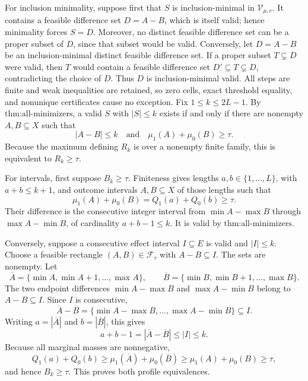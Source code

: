 For inclusion minimality, suppose first that \(S\) is inclusion-minimal in \(\mathcal V_{\mu,c}\).  It contains a feasible difference set \(D=A-B\), which is itself valid; hence minimality forces \(S=D\).  Moreover, no distinct feasible difference set can be a proper subset of \(D\), since that subset would be valid.  Conversely, let \(D=A-B\) be an inclusion-minimal distinct feasible difference set.  If a proper subset \(T\subsetneq D\) were valid, then \(T\) would contain a feasible difference set \(D'\subseteq T\subsetneq D\), contradicting the choice of \(D\).  Thus \(D\) is inclusion-minimal valid.  All steps are finite and weak inequalities are retained, so zero cells, exact threshold equality, and nonunique certificates cause no exception.
Fix \(1\leq k\leq2L-1\).  By \(\text{thm:all-minimizers}\), a valid \(S\) with \(|S|\leq k\) exists if and only if there are nonempty \(A,B\subseteq X\) such that
\[
|A-B|\leq k
\quad\text{and}\quad
\mu_1(A)+\mu_0(B)\geq\tau.
\]
Because the maximum defining \(R_k\) is over a nonempty finite family, this is equivalent to \(R_k\geq\tau\).

For intervals, first suppose \(B_k\geq\tau\).  Finiteness gives lengths \(a,b\in\{1,\ldots,L\}\), with \(a+b\leq k+1\), and outcome intervals \(A,B\subseteq X\) of those lengths such that
\[
\mu_1(A)+\mu_0(B)=Q_1(a)+Q_0(b)\geq\tau.
\]
Their difference is the consecutive integer interval from \(\min A-\max B\) through \(\max A-\min B\), of cardinality \(a+b-1\leq k\).  It is valid by \(\text{thm:all-minimizers}\).

Conversely, suppose a consecutive effect interval \(I\subseteq E\) is valid and \(|I|\leq k\).  Choose a feasible rectangle \((A,B)\in\mathcal F_{\tau}\) with \(A-B\subseteq I\).  The sets are nonempty.  Let
\[
\overline A=\{\min A,\min A+1,\ldots,\max A\},
\qquad
\overline B=\{\min B,\min B+1,\ldots,\max B\}.
\]
The two endpoint differences \(\min A-\max B\) and \(\max A-\min B\) belong to \(A-B\subseteq I\).  Since \(I\) is consecutive,
\[
\overline A-\overline B
=\{\min A-\max B,\ldots,\max A-\min B\}
\subseteq I.
\]
Writing \(a=|\overline A|\) and \(b=|\overline B|\), this gives
\[
a+b-1=|\overline A-\overline B|\leq|I|\leq k.
\]
Because all marginal masses are nonnegative,
\[
Q_1(a)+Q_0(b)\geq\mu_1(\overline A)+\mu_0(\overline B)
\geq\mu_1(A)+\mu_0(B)\geq\tau,
\]
and hence \(B_k\geq\tau\).  This proves both profile equivalences.

